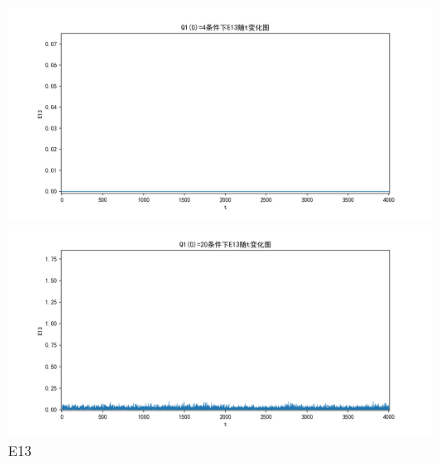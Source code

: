 \documentclass[10pt, a4paper]{article}
\begin{document}
    \begin{figure}[H]
        \begin{minipage}[t]{0.49\textwidth}
            \centering
            \includegraphics[width=\textwidth]{./q5_pics/cmp/E13.png}
        \end{minipage}
        \begin{minipage}[t]{0.49\textwidth}
            \centering
            \includegraphics[width=\textwidth]{./q5_pics/exp/E13.png}
        \end{minipage}
        \caption{E13}\label{fig:E13 in q5}
    \end{figure}
\end{document}
